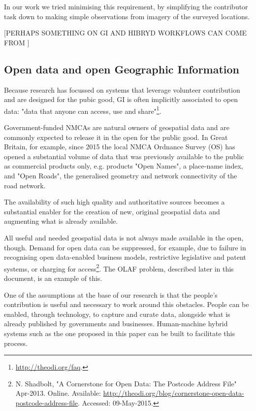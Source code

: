 In our work we tried minimising this requirement, by simplifying the contributor task down to making simple observations from imagery of the surveyed locations.

[PERHAPS SOMETHING ON GI AND HIBRYD WORKFLOWS CAN COME FROM \cite{Rice:2012vy} ]

\subsection{Open data and open Geographic Information}
\label{open-data-and-gi}

Because research has focussed on systems that leverage volunteer contribution and are designed for the pubic good, GI is often implicitly associated to open data: "data that anyone can access, use and share"\footnote{\url{http://theodi.org/faq}.}. 

Government-funded NMCAs are natural owners of geospatial data and are commonly expected to release it in the open for the public good. In Great Britain, for example, since 2015 the local NMCA Ordnance Survey (OS) has opened a substantial volume of data that was previously available to the public as commercial products only, e.g. products "Open Names", a place-name index, and "Open Roads", the generalised geometry and network connectivity of the road network.
	
The availability of such high quality and authoritative sources becomes a substantial enabler for the creation of new, original geospatial data and augmenting what is already available.

All useful and needed geospatial data is not always made available in the open, though. Demand for open data can be suppressed, for example, due to failure in recognising open data-enabled business models, restrictive legislative and patent systems, or charging for access\footnote{N. Shadbolt, "A Cornerstone for Open Data: The Postcode Address File" Apr-2013. Online. Available: \url{http://theodi.org/blog/cornerstone-open-data-postcode-address-file}. Accessed: 09-May-2015.}. The OLAF problem, described later in this document, is an example of this.
	
One of the assumptions at the base of our research is that the people's contribution is useful and necessary to work around this obstacles. People can be enabled, through technology, to capture and curate data, alongside what is already published by governments and businesses. Human-machine hybrid systems such as the one proposed in this paper can be built to facilitate this process.

